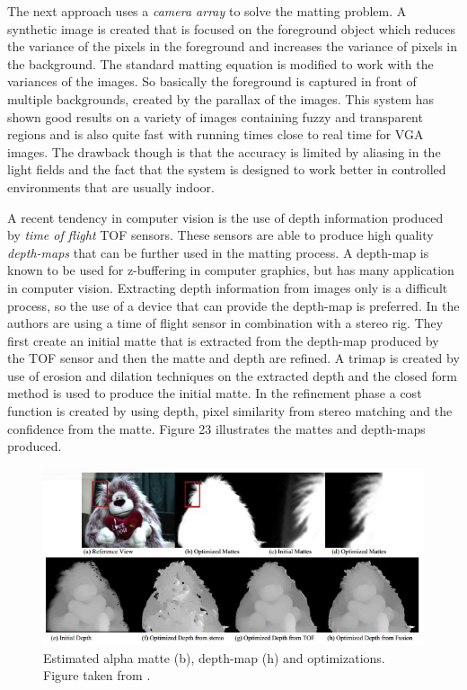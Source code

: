 The next approach uses a \textit{camera array} \cite{cameraarray} to solve the matting problem. A synthetic image is created that is focused on the foreground object which reduces the variance of the pixels in the foreground and increases the variance of pixels in the background. The standard matting equation is modified to work with the variances of the images. So basically the foreground is captured in front of multiple backgrounds, created by the parallax of the images. This system has shown good results on a variety of images containing fuzzy and transparent regions and is also quite fast with running times close to real time for VGA images. The drawback though is that the accuracy is limited by aliasing in the light fields and the fact that the system is designed to work better in controlled environments that are usually indoor.
\par
A recent tendency in computer vision is the use of depth information produced by \textit{time of flight} TOF sensors. These sensors are able to produce high quality \textit{depth-maps} that can be further used in the matting process. A depth-map is known to be used for z-buffering in computer graphics, but has many application in computer vision. Extracting depth information from images only is a difficult process, so the use of a device that can provide the depth-map is preferred. In \cite{tof} the authors are using a time of flight sensor in combination with a stereo rig. They first create an initial matte that is extracted from the depth-map produced by the TOF sensor and then the matte and depth are refined. A trimap is created by use of erosion and dilation techniques on the extracted depth and the closed form method \cite{closedform} is used to produce the initial matte. In the refinement phase a cost function is created by using depth, pixel similarity from stereo matching and the confidence from the matte. Figure 23 illustrates the mattes and depth-maps produced.

\begin{figure}[t!]
\centering
\includegraphics[width=0.8\columnwidth]{Chapter2/2/depth_figure_1.jpg}
\caption[Matting with depth information.]{Estimated alpha matte (b), depth-map (h) and optimizations. Figure taken from \cite{tof}.}
\label{fig:depth-f1}
\end{figure}

